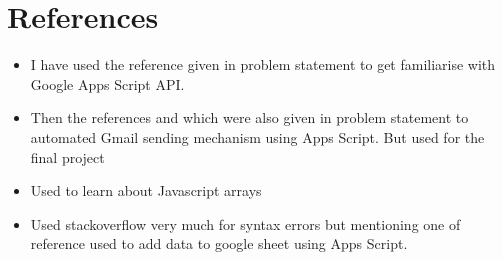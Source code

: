 \documentclass{report}
\begin{document}
\chapter{References}
\begin{itemize}
    \item I have used the reference \cite{googleappsscriptemail} given in problem statement to get familiarise with Google Apps Script API.
    
    \item Then the references \cite{googlesheetsapi} and \cite{spreadsheetemail} which were also given in problem statement to automated Gmail sending mechanism using Apps Script. But used \cite{spreadsheetemail} for the final project

    \item Used \cite{url1} to learn about Javascript arrays

    \item Used stackoverflow very much for syntax errors but mentioning one of reference \cite{url2} used to add data to google sheet using Apps Script.
\end{itemize}

\printbibliography
\end{document}
